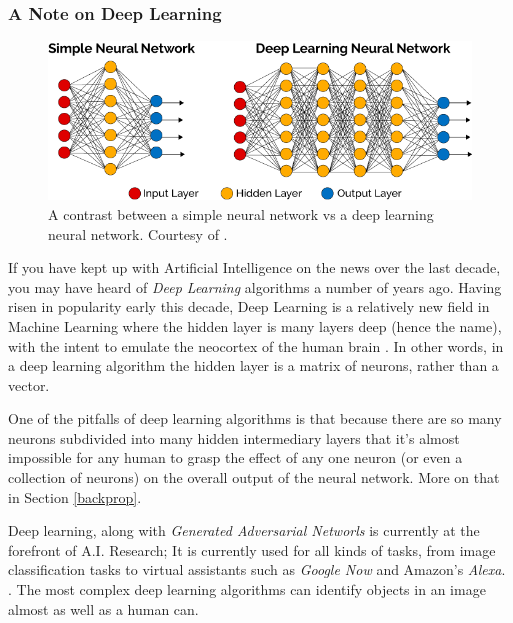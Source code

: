 \documentclass[12pt]{article}
\begin{document}
        \subsubsection{A Note on Deep Learning}
            
        \begin{figure}[h]
                \centering
                    \includegraphics[width=\textwidth]{DeepLearning-diagram.png}
                \caption{A contrast between a simple neural network vs a deep learning neural network. Courtesy of \textcite{vazquez17}. \label{deeplearningfig}}
            \end{figure}

            If you have kept up with Artificial Intelligence on the news over the last decade, you may have heard of \textit{Deep Learning} algorithms a number of years ago. Having risen in popularity early this decade, Deep Learning is a relatively new field in Machine Learning where the hidden layer is many layers deep (hence the name), with the intent to emulate the neocortex of the human brain \textcite{Hof2013}. In other words, in a deep learning algorithm the hidden layer is a matrix of neurons, rather than a vector.

            One of the pitfalls of deep learning algorithms is that because there are so many neurons subdivided into many hidden intermediary layers that it's almost impossible for any human to grasp the effect of any one neuron (or even a collection of neurons) on the overall output of the neural network. More on that in Section \ref{backprop}.

            Deep learning, along with \textit{Generated Adversarial Networls} is currently at the forefront of A.I. Research; It is currently used for all kinds of tasks, from image classification tasks to virtual assistants such as \textit{Google Now} and Amazon's \textit{Alexa}. \textcite{vazquez17}. The most complex deep learning algorithms can identify objects in an image almost as well as a human can.
 
\end{document}
